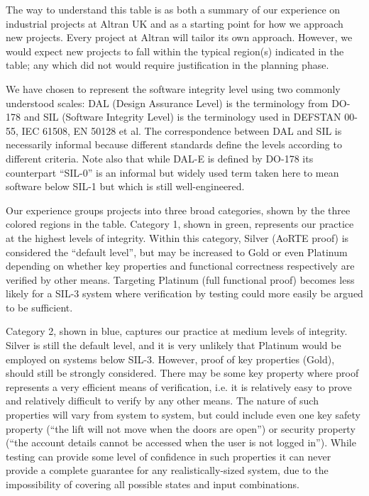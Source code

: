\documentclass{llncs}
\begin{document}
The way to understand this table is as both a summary of our experience on
industrial projects at Altran UK and as a starting point for how we approach
new projects. Every project at Altran will tailor its own approach. However, we
would expect new projects to fall within the typical region(s) indicated in the
table; any which did not would require justification in the planning phase.

We have chosen to represent the software integrity level using two commonly
understood scales: DAL (Design Assurance Level) is the terminology from DO-178
and SIL (Software Integrity Level) is the terminology used in DEFSTAN 00-55,
IEC 61508, EN 50128 et al. The correspondence between DAL and SIL is
necessarily informal because different standards define the levels according to
different criteria. Note also that while DAL-E is defined by DO-178 its
counterpart ``SIL-0'' is an informal but widely used term taken here to mean
software below SIL-1 but which is still well-engineered.

Our experience groups projects into three broad categories, shown by the three
colored regions in the table. Category 1, shown in green, represents our
practice at the highest levels of integrity. Within this category, Silver
(AoRTE proof) is considered the ``default level'', but may be increased to Gold
or even Platinum depending on whether key properties and functional correctness
respectively are verified by other means. Targeting Platinum (full functional
proof) becomes less likely for a SIL-3 system where verification by testing
could more easily be argued to be sufficient.

Category 2, shown in blue, captures our practice at medium levels of
integrity. Silver is still the default level, and it is very unlikely that
Platinum would be employed on systems below SIL-3.  However, proof of key
properties (Gold), should still be strongly considered. There may be some key
property where proof represents a very efficient means of verification, i.e. it
is relatively easy to prove and relatively difficult to verify by any other
means. The nature of such properties will vary from system to system, but could
include even one key safety property (``the lift will not move when the doors
are open'') or security property (``the account details cannot be accessed when
the user is not logged in''). While testing can provide some level of
confidence in such properties it can never provide a complete guarantee for any
realistically-sized system, due to the impossibility of covering all possible
states and input combinations.
\end{document}
